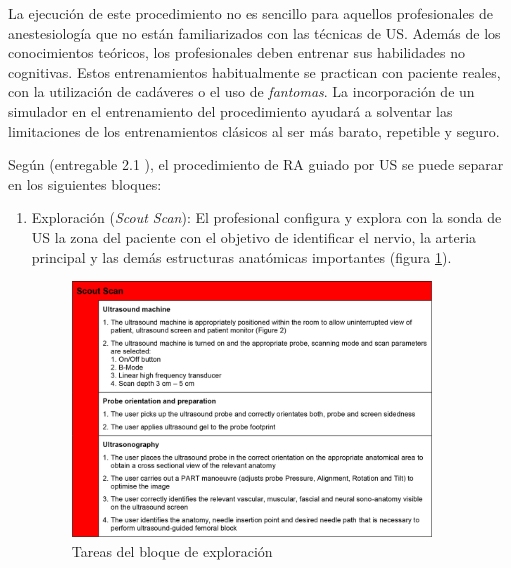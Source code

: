 La ejecución de este procedimiento no es sencillo para aquellos profesionales de anestesiología que no están familiarizados con las técnicas de \ac{US}. Además de los conocimientos teóricos, los profesionales deben entrenar sus habilidades no cognitivas. Estos entrenamientos habitualmente se practican con paciente reales, con la utilización de cadáveres\cite{Tsui2007} o el uso de \emph{fantomas}\cite{phantomra}. La incorporación de un simulador en el entrenamiento del procedimiento ayudará a solventar las limitaciones de los entrenamientos clásicos al ser más barato, repetible y seguro.


Según (entregable 2.1 \cite{rasimasweb}), el procedimiento de \ac{RA} guiado por \ac{US} se puede separar en los siguientes bloques:
\begin{enumerate}
    \item Exploración (\emph{Scout Scan}): El profesional configura y explora con la sonda de \ac{US} la zona del paciente con el objetivo de identificar el nervio, la arteria principal y las demás estructuras anatómicas importantes (figura \ref{fig:scoutscan}). 
\begin{figure}[th]
   \centering
    \includegraphics[width=0.9\textwidth]{IMG/scoutscan.png}
    \caption{Tareas del bloque de exploración }
   \label{fig:scoutscan}
   

\end{figure}
\end{enumerate}
